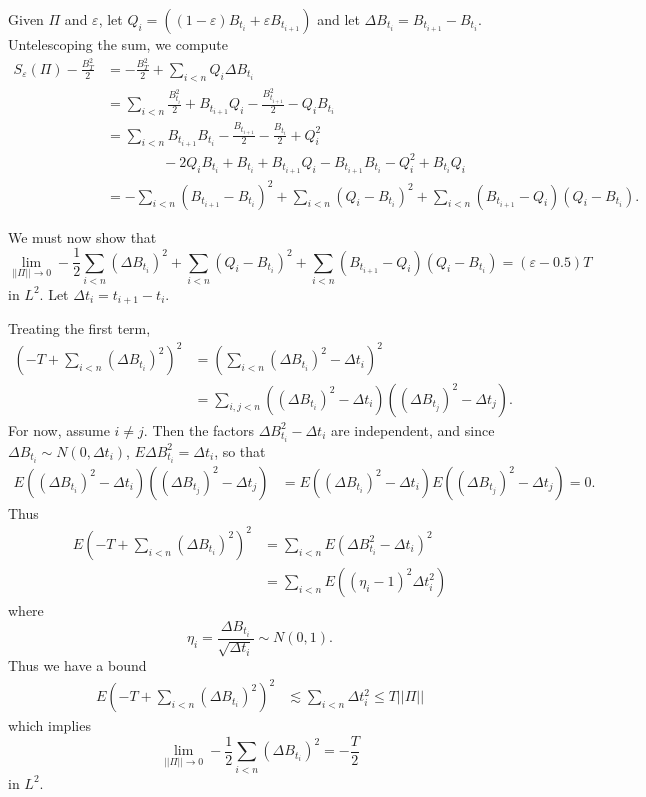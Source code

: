 \documentclass[10pt]{article}
\renewcommand{\epsilon}{\varepsilon}
\theoremstyle{definition}
\begin{document}
Given $\Pi$ and $\epsilon$, let $Q_i = ((1 - \epsilon)B_{t_i} + \epsilon B_{t_{i+1}})$ and let $\Delta B_{t_i} = B_{t_{i+1}} - B_{t_i}$.
Untelescoping the sum, we compute
\begin{align*}
S_\epsilon(\Pi) - \frac{B_T^2}{2} &= -\frac{B_T^2}{2} + \sum_{i < n} Q_i \Delta B_{t_i}\\
&= \sum_{i < n} \frac{B_{t_i}^2}{2} + B_{t_{i+1}}Q_i - \frac{B_{t_{i+1}}^2}{2} - Q_i B_{t_i}\\
&= \sum_{i < n} B_{t_{i+1}} B_{t_i} - \frac{B_{t_{i+1}}}{2} - \frac{B_{t_i}}{2} + Q_i^2 \\
&\qquad \qquad- 2Q_iB_{t_i} + B_{t_i} + B_{t_{i+1}}Q_i - B_{t_{i+1}}B_{t_i} - Q_i^2 + B_{t_i}Q_i\\
&= -\sum_{i < n} (B_{t_{i+1}} - B_{t_i})^2 + \sum_{i < n} (Q_i - B_{t_i})^2 + \sum_{i < n} (B_{t_{i+1}} - Q_i)(Q_i - B_{t_i}).
\end{align*}

We must now show that
$$\lim_{||\Pi|| \to 0} -\frac{1}{2}\sum_{i < n} (\Delta B_{t_i})^2 + \sum_{i < n} (Q_i - B_{t_i})^2 + \sum_{i < n} (B_{t_{i+1}} - Q_i)(Q_i - B_{t_i}) = (\epsilon - 0.5)T$$
in $L^2$.
Let $\Delta t_i = t_{i+1} - t_i$.

Treating the first term,
\begin{align*}
\left(-T + \sum_{i < n} (\Delta B_{t_i})^2 \right)^2 &= \left(\sum_{i < n} (\Delta B_{t_i})^2 - \Delta t_i\right)^2\\
&= \sum_{i,j < n} \left((\Delta B_{t_i})^2 - \Delta t_i \right)\left((\Delta B_{t_j})^2 - \Delta t_j \right).
\end{align*}
For now, assume $i \neq j$. Then the factors $\Delta B_{t_i}^2 - \Delta t_i$ are independent, and since $\Delta B_{t_i} \sim N(0, \Delta t_i)$, $E\Delta B_{t_i}^2 = \Delta t_i$, so that
\begin{align*}
E\left((\Delta B_{t_i})^2 - \Delta t_i \right)\left((\Delta B_{t_j})^2 - \Delta t_j \right) &= E\left((\Delta B_{t_i})^2 - \Delta t_i \right)E\left((\Delta B_{t_j})^2 - \Delta t_j \right) = 0.
\end{align*}
Thus
\begin{align*}
E\left(-T + \sum_{i < n} (\Delta B_{t_i})^2 \right)^2 &= \sum_{i < n} E(\Delta B_{t_i}^2 - \Delta t_i)^2 \\
&= \sum_{i < n} E((\eta_i - 1)^2 \Delta t_i^2)
\end{align*}
where
$$\eta_i = \frac{\Delta B_{t_i}}{\sqrt{\Delta t_i}} \sim N(0, 1).$$
Thus we have a bound
\begin{align*}
E\left(-T + \sum_{i < n} (\Delta B_{t_i})^2 \right)^2 &\lesssim \sum_{i < n} \Delta t_i^2 \leq T||\Pi||
\end{align*}
which implies
$$\lim_{||\Pi|| \to 0} -\frac{1}{2}\sum_{i < n} (\Delta B_{t_i})^2 = -\frac{T}{2}$$
in $L^2$.
\end{document}
